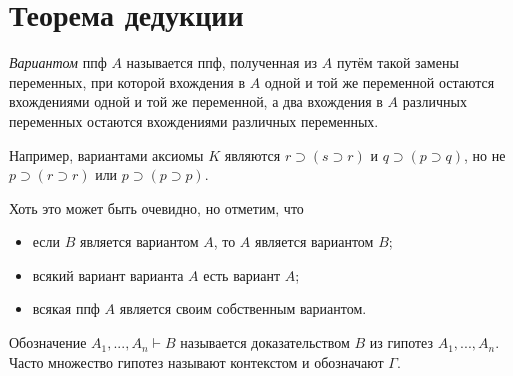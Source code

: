 \section{Теорема дедукции}

\begin{definition}
    {\it Вариантом} ппф $A$ называется ппф, полученная из $A$ путём такой замены переменных, при которой вхождения в $A$ одной и той же переменной остаются вхождениями одной и той же переменной, а два вхождения в $A$ различных переменных остаются вхождениями различных переменных.
\end{definition}

Например, вариантами аксиомы $K$ являются $r \supset (s \supset r)$ и $q \supset (p \supset q)$, но не $p\supset(r\supset r)$ или $p\supset(p\supset p)$.

Хоть это может быть очевидно, но отметим, что
\begin{itemize}
    \item если $B$ является вариантом $A$, то $A$ является вариантом $B$;
    \item всякий вариант варианта $A$ есть вариант $A$;
    \item всякая ппф $A$ является своим собственным вариантом.
\end{itemize}

\begin{remark}
    Обозначение $A_1,...,A_n \vdash B$ называется доказательством $B$ из гипотез $A_1,...,A_n$. Часто множество гипотез называют контекстом и обозначают $\Gamma$.
\end{remark}

